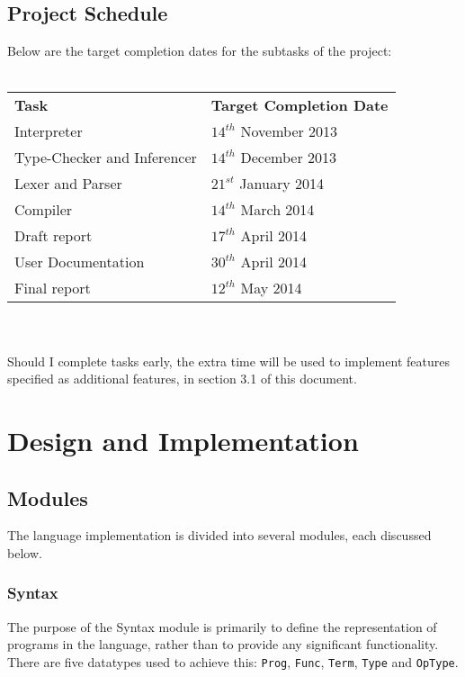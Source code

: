 \documentclass{article}
\begin{document}
\subsection{Project Schedule}
Below are the target completion dates for the subtasks of the project:
\\\\
\begin{tabular}{l l}
    \indent \textbf{Task}              & \textbf{Target Completion Date} \\
    \indent Interpreter                & $14^{th}$ November 2013         \\
    \indent Type-Checker and Inferencer & $14^{th}$ December 2013         \\
    \indent Lexer and Parser            & $21^{st}$ January  2014         \\
    \indent Compiler                   & $14^{th}$ March    2014         \\
    \indent Draft report               & $17^{th}$ April    2014         \\
    \indent User Documentation         & $30^{th}$ April    2014         \\
    \indent Final report               & $12^{th}$ May      2014         \\
\end{tabular}
\\\\
Should I complete tasks early, the extra time will be used to implement features specified as additional features, in section 3.1 of this document.

\pagebreak
\section{Design and Implementation}
\subsection{Modules}
The language implementation is divided into several modules, each discussed below.
\subsubsection{Syntax}
The purpose of the Syntax module is primarily to define the representation of programs in the language, rather than to provide any significant functionality. There are five datatypes used to achieve this: \texttt{Prog}, \texttt{Func}, \texttt{Term}, \texttt{Type} and \texttt{OpType}.
\end{document}
